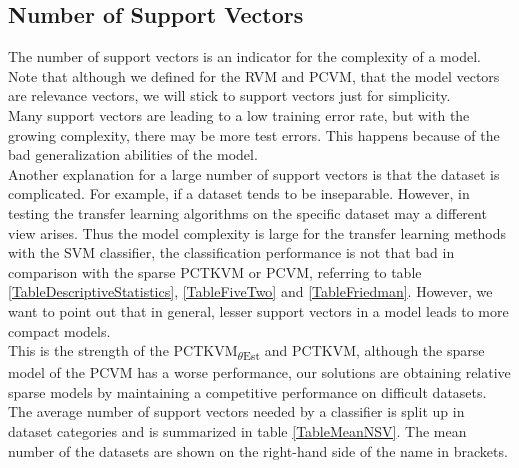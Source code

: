 \subsection{Number of Support Vectors}\label{EmSubSecNumberSV}
The number of support vectors is an indicator for the complexity of a model. 
Note that although we defined for the \acs{RVM} and \acs{PCVM}, that the model vectors are relevance vectors, we will stick to support vectors just for simplicity.\\
Many support vectors are leading to a low training error rate, but with the growing complexity, there may be more test errors. 
This happens because of the bad generalization abilities of the model.\cite[p. 81]{Igual.2017}\\
Another explanation for a large number of support vectors is that the dataset is complicated. For example, if a dataset tends to be inseparable.\cite[p. 78;86]{Abe.2010}
However, in testing the transfer learning algorithms on the specific dataset may a different view arises. 
Thus the model complexity is large for the transfer learning methods with the \acs{SVM} classifier, the classification performance is not that bad in comparison with the sparse \acs{PCTKVM} or \acs{PCVM}, referring to table \ref{TableDescriptiveStatistics}, \ref{TableFiveTwo} and \ref{TableFriedman}.
However, we want to point out that in general, lesser support vectors in a model leads to more compact models.\cite[p. 349]{Bishop.2009}\\
This is the strength of the \acs{PCTKVM}\textsubscript{$\theta$Est} and \acs{PCTKVM}, although the sparse model of the \acs{PCVM} has a worse performance, our solutions are obtaining relative sparse models by maintaining a competitive performance on difficult datasets.
The average number of support vectors needed by a classifier is split up in dataset categories and is summarized in table \ref{TableMeanNSV}. 
The mean number of the datasets are shown on the right-hand side of the name in brackets.
\begin{table}[h]
	\centering
\end{table}
\FloatBarrier
